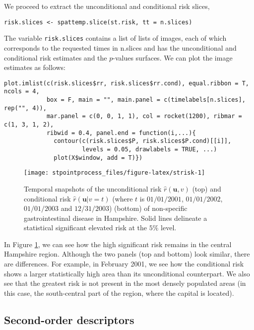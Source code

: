 We proceed to extract the unconditional and conditional risk slices,

\begin{verbatim}
risk.slices <- spattemp.slice(st.risk, tt = n.slices)
\end{verbatim}

The variable \texttt{risk.slices} contains a list of lists of images, each of which corresponds to the requested times in n.slices and has the unconditional and conditional risk estimates and the \(p\)-values surfaces. We can plot the image estimates as follows:

\begin{verbatim}
plot.imlist(c(risk.slices$rr, risk.slices$rr.cond), equal.ribbon = T, ncols = 4, 
            box = F, main = "", main.panel = c(timelabels[n.slices], rep("", 4)), 
            mar.panel = c(0, 0, 1, 1), col = rocket(1200), ribmar = c(1, 3, 1, 2), 
            ribwid = 0.4, panel.end = function(i,...){
              contour(c(risk.slices$P, risk.slices$P.cond)[[i]], 
                      levels = 0.05, drawlabels = TRUE, ...)
              plot(X$window, add = T)})
\end{verbatim}

\begin{figure}

{\centering \texttt{[image: stpointprocess\_files/figure-latex/strisk-1]} 

}

\caption{Temporal snapshots of the unconditional risk $\hat{r}(\mathbf{u},v)$ (top) and conditional risk $\hat{r}(\mathbf{u}|v= t)$ (where $t$ is $01/01/2001$, $01/01/2002$, $01/01/2003$ and $12/31/2003$) (bottom) of non-specific gastrointestinal disease in Hampshire. Solid lines delineate a statistical significant elevated risk at the $5\%$ level.}\label{fig:strisk}
\end{figure}

In Figure \ref{fig:strisk}, we can see how the high significant risk remains in the central Hampshire region. Although the two panels (top and bottom) look similar, there are differences. For example, in February 2001, we see how the conditional risk shows a larger statistically high area than its unconditional counterpart. We also see that the greatest risk is not present in the most densely populated areas (in this case, the south-central part of the region, where the capital is located).

\hypertarget{second-order-descriptors-1}{%
\subsection{Second-order descriptors}\label{second-order-descriptors-1}}

